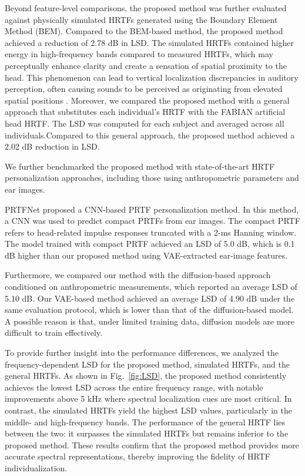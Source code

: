 \documentclass[a4paper,fleqn]{cas-dc}
\begin{document}
Beyond feature-level comparisons, the proposed method was further evaluated against physically simulated HRTFs generated using the Boundary Element Method (BEM)\cite{brinkmann_recent_2023-1}. Compared to the BEM-based method, the proposed method achieved a reduction of 2.78 dB in LSD. The simulated HRTFs contained higher energy in high-frequency bands compared to measured HRTFs, which may perceptually enhance clarity and create a sensation of spatial proximity to the head. This phenomenon can lead to vertical localization discrepancies in auditory perception, often causing sounds to be perceived as originating from elevated spatial positions \cite{blauert_sound_nodate}. Moreover, we compared the proposed method with a general approach that substitutes each individual’s HRTF with the FABIAN artificial head HRTF. The LSD was computed for each subject and averaged across all individuals.Compared to this general approach, the proposed method achieved a 2.02 dB reduction in LSD.



We further benchmarked the proposed method with state-of-the-art HRTF personalization approaches, including those using anthropometric parameters and ear images.

PRTFNet\cite{ko_prtfnet_2023} proposed a CNN-based PRTF personalization method. In this method, a CNN was used to predict compact PRTFs from ear images. The compact PRTF refers to head-related impulse responses truncated with a 2-ms Hanning window. The model trained with compact PRTF achieved an LSD of 5.0 dB, which is 0.1 dB higher than our proposed method using VAE-extracted ear-image features.



Furthermore, we compared our method with the diffusion-based approach conditioned on anthropometric measurements, which reported an average LSD of 5.10 dB\cite{10887566}. Our VAE-based method achieved an average LSD of 4.90 dB under the same evaluation protocol, which is lower than that of the diffusion-based model. A possible reason is that, under limited training data, diffusion models are more difficult to train effectively.



To provide further insight into the performance differences, we analyzed the frequency-dependent LSD for the proposed method, simulated HRTFs, and the general HRTFs. As shown in Fig.~\ref{fig:LSD}, the proposed method consistently achieves the lowest LSD across the entire frequency range, with notable improvements above 5 kHz where spectral localization cues are most critical. In contrast, the simulated HRTFs yield the highest LSD values, particularly in the middle- and high-frequency bands. The performance of the general HRTF lies between the two: it surpasses the simulated HRTFs but remains inferior to the proposed method. These results confirm that the proposed method provides more accurate spectral representations, thereby improving the fidelity of HRTF individualization.
\end{document}
